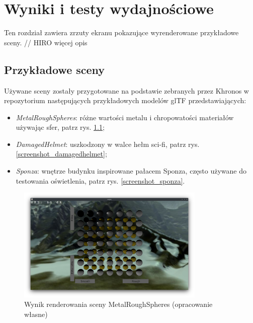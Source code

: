 \chapter{Wyniki i testy wydajnościowe}
\label{chap:research}

Ten rozdział zawiera zrzuty ekranu pokazujące wyrenderowane przykładowe sceny.
// HIRO więcej opis

\section{Przykładowe sceny}

Używane sceny zostały przygotowane na podstawie zebranych przez Khronos w repozytorium \cite{GLTFSAMPLEMODELS} następujących przykładowych modelów glTF przedstawiających:
\begin{itemize}
	\item \textit{MetalRoughSpheres}: różne wartości metalu i chropowatości materiałów używając sfer, patrz rys. \ref{screenshot_metalroughspheres};
	\item \textit{DamagedHelmet}: uszkodzony w walce hełm sci-fi, patrz rys. \ref{screenshot_damagedhelmet};
	\item \textit{Sponza}: wnętrze budynku inspirowane pałacem Sponza, często używane do testowania oświetlenia, patrz rys. \ref{screenshot_sponza}.
\end{itemize}

\begin{figure}[!htb]
	\centering
	\includegraphics[width=0.8\textwidth]{images/render_metalroughspheres.png}
	\caption{Wynik renderowania sceny MetalRoughSpheres (opracowanie własne)}
	\label{screenshot_metalroughspheres}
\end{figure}

